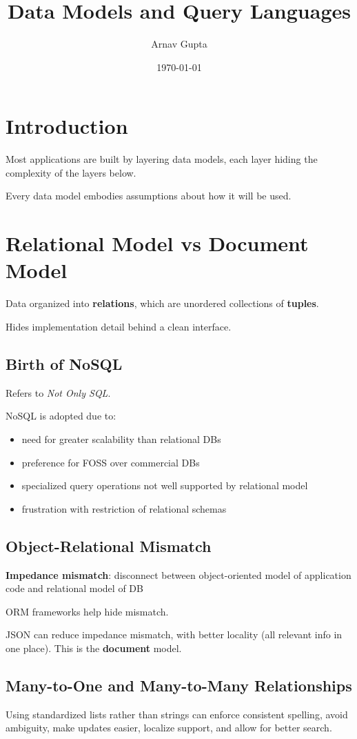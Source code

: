 \documentclass[11pt]{article}
\author{Arnav Gupta}
\date{\today}
\title{Data Models and Query Languages}
\begin{document}
\maketitle
\tableofcontents

\section{Introduction}
\label{sec:orgebd648f}
Most applications are built by layering data models, each layer hiding the
complexity of the layers below.

Every data model embodies assumptions about how it will be used.
\section{Relational Model vs Document Model}
\label{sec:orgcf395ab}
Data organized into \textbf{relations}, which are unordered collections of \textbf{tuples}.

Hides implementation detail behind a clean interface.
\subsection{Birth of NoSQL}
\label{sec:orgb44a15e}
Refers to \emph{Not Only SQL}.

NoSQL is adopted due to:
\begin{itemize}
\item need for greater scalability than relational DBs
\item preference for FOSS over commercial DBs
\item specialized query operations not well supported by relational model
\item frustration with restriction of relational schemas
\end{itemize}
\subsection{Object-Relational Mismatch}
\label{sec:orgff679f1}
\textbf{Impedance mismatch}: disconnect between object-oriented model of application
code and relational model of DB

ORM frameworks help hide mismatch.

JSON can reduce impedance mismatch, with better locality (all relevant info
in one place).
This is the \textbf{document} model.
\subsection{Many-to-One and Many-to-Many Relationships}
\label{sec:orge89bd45}
Using standardized lists rather than strings can enforce consistent spelling,
avoid ambiguity, make updates easier, localize support, and allow for better
search.
\end{document}
